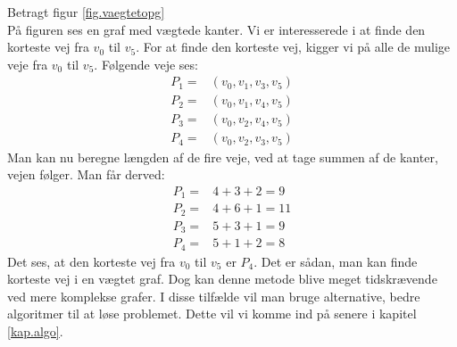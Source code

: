 \begin{exmp}
Betragt figur \ref{fig.vaegtetopg} \\

På figuren ses en graf med vægtede kanter. Vi er interesserede i at finde den korteste vej fra $v_0$ til $v_5$. For at finde den korteste vej, kigger vi på alle de mulige veje fra $v_0$ til $v_5$.
Følgende veje ses:
\begin{align*}
	P_1=&(v_0,v_1,v_3,v_5)\\
	P_2=&(v_0,v_1,v_4,v_5)\\
	P_3=&(v_0,v_2,v_4,v_5)\\
	P_4=&(v_0,v_2,v_3,v_5)
\end{align*}
Man kan nu beregne længden af de fire veje, ved at tage summen af de kanter, vejen følger. Man får derved:
\begin{align*}
	P_1=&4+3+2=9\\
	P_2=&4+6+1=11\\
	P_3=&5+3+1=9\\
	P_4=&5+1+2=8
\end{align*}
Det ses, at den korteste vej fra $v_0$ til $v_5$ er $P_4$. 
Det er sådan, man kan finde korteste vej i en vægtet graf. Dog kan denne metode blive meget tidskrævende ved mere komplekse grafer. I disse tilfælde vil man bruge alternative, bedre algoritmer til at løse problemet. Dette vil vi komme ind på senere i kapitel \ref{kap.algo}.
\end{exmp}
